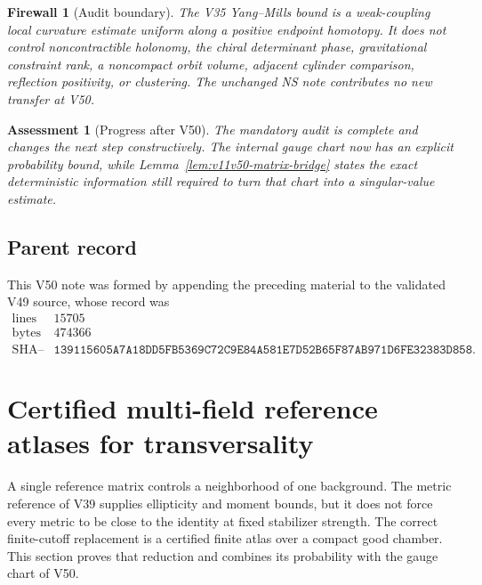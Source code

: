 \documentclass[11pt]{article}
\newtheorem{assessment}[theorem]{Assessment}
\newtheorem{firewall}[theorem]{Firewall}
\begin{document}
\begin{firewall}[Audit boundary]
\label{fire:v11v50-boundary}
The V35 Yang--Mills bound is a weak-coupling local curvature estimate
uniform along a positive endpoint homotopy.  It does not control
noncontractible holonomy, the chiral determinant phase, gravitational
constraint rank, a noncompact orbit volume, adjacent cylinder
comparison, reflection positivity, or clustering.  The unchanged NS
note contributes no new transfer at V50.
\end{firewall}

\begin{assessment}[Progress after V50]
\label{ass:v11v50-status}
The mandatory audit is complete and changes the next step
constructively.  The internal gauge chart now has an explicit
probability bound, while Lemma~\ref{lem:v11v50-matrix-bridge} states
the exact deterministic information still required to turn that chart
into a singular-value estimate.
\end{assessment}

\subsection{Parent record}

This V50 note was formed by appending the preceding material to the
validated V49 source, whose record was
\[
\begin{array}{c|c}
\text{lines}&15705\\
\text{bytes}&474366\\
\text{SHA--256}&
\texttt{139115605A7A18DD5FB5369C72C9E84A581E7D52B65F87AB971D6FE32383D858}.
\end{array}                                                     \tag{50.13}
\]


\section{Certified multi-field reference atlases for transversality}
\label{sec:v11v51}

A single reference matrix controls a neighborhood of one background.
The metric reference of V39 supplies ellipticity and moment bounds, but
it does not force every metric to be close to the identity at fixed
stabilizer strength.  The correct finite-cutoff replacement is a
certified finite atlas over a compact good chamber.  This section proves
that reduction and combines its probability with the gauge chart of
V50.
\end{document}
